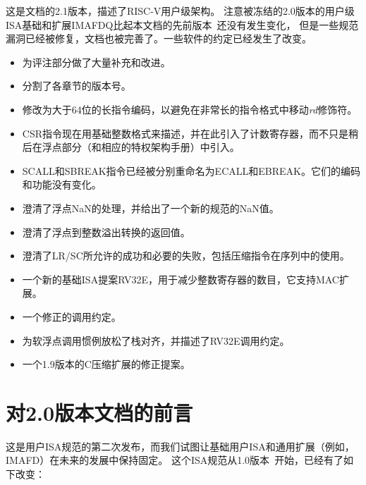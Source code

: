 这是文档的2.1版本，描述了RISC-V用户级架构。
注意被冻结的2.0版本的用户级ISA基础和扩展IMAFDQ比起本文档的先前版本~\cite{riscvtr2}还没有发生变化，
但是一些规范漏洞已经被修复，文档也被完善了。一些软件的约定已经发生了改变。
\begin{itemize}
\parskip 0pt
\itemsep 1pt
\item 为评注部分做了大量补充和改进。
\item 分割了各章节的版本号。
\item 修改为大于64位的长指令编码，以避免在非常长的指令格式中移动{\em rd}修饰符。
\item CSR指令现在用基础整数格式来描述，并在此引入了计数寄存器，而不只是稍后在浮点部分（和相应的特权架构手册）中引入。
\item SCALL和SBREAK指令已经被分别重命名为ECALL和EBREAK。它们的编码和功能没有变化。
\item 澄清了浮点NaN的处理，并给出了一个新的规范的NaN值。
\item 澄清了浮点到整数溢出转换的返回值。
\item 澄清了LR/SC所允许的成功和必要的失败，包括压缩指令在序列中的使用。
\item 一个新的基础ISA提案RV32E，用于减少整数寄存器的数目，它支持MAC扩展。
\item 一个修正的调用约定。
\item 为软浮点调用惯例放松了栈对齐，并描述了RV32E调用约定。
\item 一个1.9版本的C压缩扩展的修正提案。
\end{itemize}

\section*{对2.0版本文档的前言}

这是用户ISA规范的第二次发布，而我们试图让基础用户ISA和通用扩展（例如，IMAFD）在未来的发展中保持固定。
这个ISA规范从1.0版本~\cite{riscvtr}开始，已经有了如下改变：


